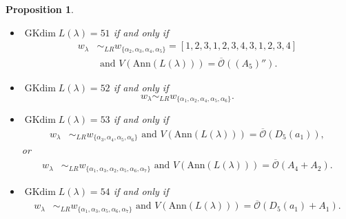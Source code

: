 \documentclass[reqno,12pt]{amsart}
\numberwithin{equation}{section}
\theoremstyle{plain}
\newtheorem{Prop}[Thm]{Proposition}
\theoremstyle{definition}
\newcommand{\lam}{\lambda}
\newcommand{\Ann}{\mathrm{Ann}}
\newcommand{\gkd}{\operatorname{GKdim}}
\begin{document}
\begin{Prop}
\begin{itemize}
        \item[(16)] $\gkd L(\lambda)=51$ if and only if 
        \begin{align*}
w_{\lambda}&\sim_{LR}w_{\{\alpha_2,\alpha_3,\alpha_4,\alpha_5\}}=[1,2,3,1,2,3,4,3,1,2,3,4]\\
&\text{~and~} V(\Ann (L(\lam)))=\overline{\mathcal{O}}(({A}_5)'').
        \end{align*}
        
        
        \item[(17)] $\gkd L(\lambda)=52$ if and only if $$w_{\lambda}\sim_{LR}w_{\{\alpha_1,\alpha_2,\alpha_4,\alpha_5,\alpha_6\}}.$$
        \item[(18)] $\gkd L(\lambda)=53$ if and only if \begin{align*}
w_{\lambda}&\sim_{LR}w_{\{\alpha_3,\alpha_4,\alpha_5,\alpha_6\}}\text{~and~} V(\Ann (L(\lam)))=\overline{\mathcal{O}}({D}_5(a_1)),
\end{align*}
        or
\begin{align*}
w_{\lambda}&\sim_{LR}w_{\{\alpha_1,\alpha_3,\alpha_2,\alpha_5,\alpha_6,\alpha_7\}} \text{~and~} V(\Ann (L(\lam)))=\overline{\mathcal{O}}(A_4+A_2).
\end{align*}

  \item[(19)] $\gkd L(\lambda)=54$ if and only if \begin{align*}
    w_{\lambda}&\sim_{LR}w_{\{\alpha_1,\alpha_3,\alpha_5,\alpha_6,\alpha_7\}}\text{~and~} V(\Ann (L(\lam)))=\overline{\mathcal{O}}({D}_5(a_1)+A_1).
  \end{align*}
  

\end{itemize}
\end{Prop}
\end{document}

